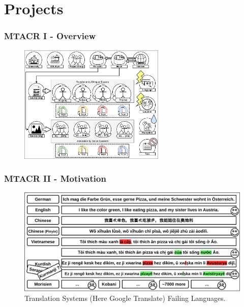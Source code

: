 \documentclass[aspectratio=169]{beamer}
\begin{document}
\begin{frame}[fragile]
\begin{minipage}{.3\textwidth}
\begin{figure}
        \end{figure}
    \end{minipage}
   \end{frame}


\section{Projects}

\begin{frame}[fragile]
	\frametitle{MTACR I - Overview}
    \centering
    \begin{minipage}{1.0\textwidth}
        \centering
        \begin{figure}
            \centering
            \includegraphics[width=0.62\textwidth]{images/MTACR-Overview.png} 
        \end{figure}
    \end{minipage}
\end{frame}

\begin{frame}[fragile]
	\frametitle{MTACR II - Motivation}
    \begin{figure}
	    \centering
	    \includegraphics[width=1.0\textwidth]{images/CRAMT-Tool-MotivationSimpleMore.png}
        \caption{Translation Systems (Here Google Translate) Failing Languages.}
	\end{figure}
\end{frame}
\end{document}
